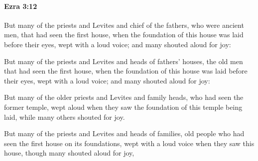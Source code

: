 		\paragraph{Ezra 3:12} %
			\label{EZRA-3-12}

			But many of the priests and Levites and chief of the fathers, who were ancient men, that had seen the first house, when the foundation of this house was laid before their eyes, wept with a loud voice; and many shouted aloud for joy:

			\begin{versebox}
					\item[BHS] 
					\item[LXX] 
					\item[ASV] But many of the priests and Levites and heads of fathers' houses, the old men that had seen the first house, when the foundation of this house was laid before their eyes, wept with a loud voice; and many shouted aloud for joy:
					\item[NIV] But many of the older priests and Levites and family heads, who had seen the former temple, wept aloud when they saw the foundation of this temple being laid, while many others shouted for joy.
					\item[NRSV] But many of the priests and Levites and heads of families, old people who had seen the first house on its foundations, wept with a loud voice when they saw this house, though many shouted aloud for joy,
			\end{versebox}

